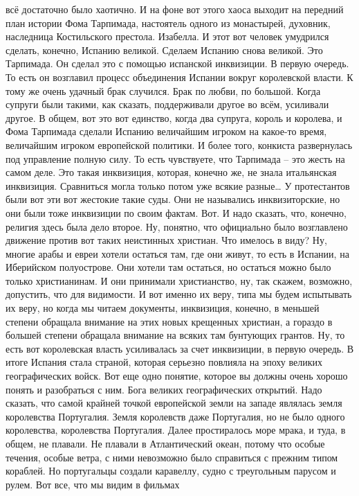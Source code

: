 всё достаточно было хаотично. И на фоне вот этого хаоса выходит на передний план
истории Фома Тарпимада, настоятель одного из монастырей, духовник, наследница
Костильского престола. Изабелла. И этот вот человек умудрился сделать, конечно,
Испанию великой. Сделаем Испанию снова великой. Это Тарпимада. Он сделал это с
помощью испанской инквизиции. В первую очередь. То есть он возглавил процесс
объединения Испании вокруг королевской власти. К тому же очень удачный брак
случился. Брак по любви, по большой. Когда супруги были такими, как сказать,
поддерживали другое во всём, усиливали другое. В общем, вот это вот единство,
когда два супруга, король и королева, и Фома Тарпимада сделали Испанию
величайшим игроком на какое-то время, величайшим игроком европейской политики. И
более того, конкиста развернулась под управление полную силу. То есть
чувствуете, что Тарпимада – это жесть на самом деле. Это такая инквизиция,
которая, конечно же, не знала итальянская инквизиция. Сравниться могла только
потом уже всякие разные… У протестантов были вот эти вот жестокие такие суды.
Они не назывались инквизиторские, но они были тоже инквизиции по своим фактам.
Вот. И надо сказать, что, конечно, религия здесь была дело второе. Ну, понятно,
что официально было возглавлено движение против вот таких неистинных христиан.
Что имелось в виду? Ну, многие арабы и евреи хотели остаться там, где они живут,
то есть в Испании, на Иберийском полуострове. Они хотели там остаться, но
остаться можно было только христианинам. И они принимали христианство, ну, так
скажем, возможно, допустить, что для видимости. И вот именно их веру, типа мы
будем испытывать их веру, но когда мы читаем документы, инквизиция, конечно, в
меньшей степени обращала внимание на этих новых крещенных христиан, а гораздо в
большей степени обращала внимание на всяких там бунтующих грантов. Ну, то есть
вот королевская власть усиливалась за счет инквизиции, в первую очередь. В итоге
Испания стала страной, которая серьезно повлияла на эпоху великих географических
войск. Вот еще одно понятие, которое вы должны очень хорошо понять и разобраться
с ним. Бога великих географических открытий. Надо сказать, что самой крайней
точкой европейской земли на западе являлась земля королевства Португалия. Земля
королевств даже Португалия, но не было одного королевства, королевства
Португалия. Далее простиралось море мрака, и туда, в общем, не плавали. Не
плавали в Атлантический океан, потому что особые течения, особые ветра, с ними
невозможно было справиться с прежним типом кораблей. Но португальцы создали
каравеллу, судно с треугольным парусом и рулем. Вот все, что мы видим в фильмах
